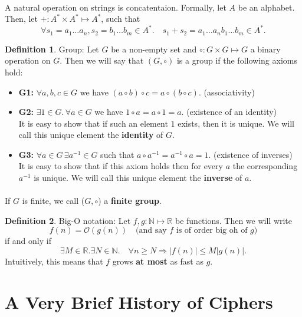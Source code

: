 \documentclass{article}
\theoremstyle{definition}
\newtheorem{definition}{Definition}[section]
\theoremstyle{example}
\newcommand{\Oh}{\mathcal{O}}
\newcommand{\Nat}{\mathbb{N}}
\newcommand{\Reals}{\mathbb{R}}
\begin{document}
\paragraph{}
A natural operation on strings is concatentaion. Formally, let $A$ be an
alphabet. Then, let $+ : A^* \times A^* \mapsto A^*$, such that
\[
  \forall s_1 = a_1\hdots a_n, s_2 = b_1 \hdots b_m \in A^*.\quad s_1 + s_2 =
  a_1\hdots a_nb_1 \hdots b_m \in A^*.
\]
\begin{definition}{Group:}
  Let $G$ be a non-empty set and $\circ: G \times G \mapsto G$ a binary operation on $G$.
  Then we will say that $(G, \circ)$ is a group if the following axioms hold:
  \begin{itemize}
  \item \textbf{G1:} $\forall a, b, c \in G$ we have $(a \circ b) \circ c = a
    \circ (b \circ c)$. (associativity)
  \item \textbf{G2:} $\exists 1 \in G. \,\forall a \in G$ we have $1 \circ a = a \circ 1 = a.$ (existence of an identity)
    \\
    It is easy to show that if such an element $1$ exists, then it
    is unique. We will call this unique element the \textbf{identity} of $G$.
    
  \item \textbf{G3:} $\forall a \in G\, \exists a^{-1} \in G$ such that $a \circ
    a^{-1} = a ^{-1} \circ a = 1$. (existence of inverses)
    \\
    It is easy to show that if this axiom holds
    then for every $a$ the corresponding $a^{-1}$ is unique. We will call this
    unique element the \textbf{inverse} of $a$. 
  \end{itemize}
\end{definition}
\paragraph{} If $G$ is finite, we call ($G, \circ$) a \textbf{finite group}.
\begin{definition}{Big-O notation:} Let $f, g: \Nat \mapsto \Reals $ be
  functions. Then we will write
  \[
    f(n) = \Oh(g(n)) \quad \text{(and say $f$ is of order big oh of $g$)}
  \]
  if and only if
  \[
    \exists M \in \Reals. \exists N \in \Nat.\quad \forall n \geq N \Rightarrow
    |f(n)| \leq M|g(n)|.
  \]
  Intuitively, this means that $f$ grows \textbf{at most} as fast as $g$.
\end{definition}
\section{A Very Brief History of Ciphers}
\end{document}
